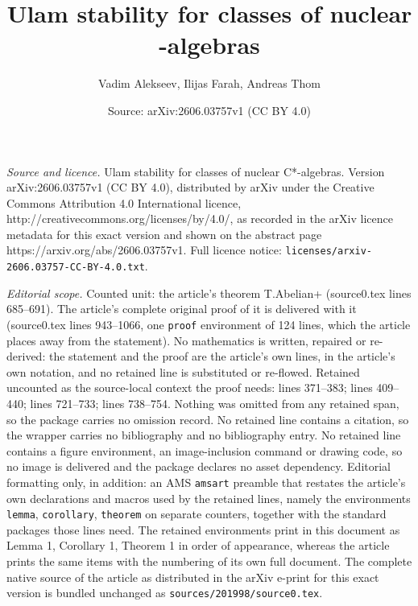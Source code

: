 \documentclass[10pt,a4paper]{amsart}
\title{Ulam stability for classes of nuclear \cstar-algebras}
\author{Vadim Alekseev, Ilijas Farah, Andreas Thom}
\date{Source: arXiv:2606.03757v1 (CC BY 4.0)}
\newcommand{\cstar}{C*}
\begin{document}
\maketitle

\noindent\emph{Source and licence.} Ulam stability for classes of nuclear \cstar-algebras. Version arXiv:2606.03757v1 (CC BY 4.0), distributed by arXiv under the Creative Commons Attribution 4.0 International licence, http://creativecommons.org/licenses/by/4.0/, as recorded in the arXiv licence metadata for this exact version and shown on the abstract page https://arxiv.org/abs/2606.03757v1. Full licence notice: \texttt{licenses/arxiv-2606.03757-CC-BY-4.0.txt}.\par\smallskip

\noindent\textit{Editorial scope.} Counted unit: the article's theorem T.Abelian+ (source0.tex lines 685--691). The article's complete original proof of it is delivered with it (source0.tex lines 943--1066, one \texttt{proof} environment of 124 lines, which the article places away from the statement). No mathematics is written, repaired or re-derived: the statement and the proof are the article's own lines, in the article's own notation, and no retained line is substituted or re-flowed.  Retained uncounted as the source-local context the proof needs: lines 371--383; lines 409--440; lines 721--733; lines 738--754.  Nothing was omitted from any retained span, so the package carries no omission record.  No retained line contains a citation, so the wrapper carries no bibliography and no bibliography entry.  No retained line contains a figure environment, an image-inclusion command or drawing code, so no image is delivered and the package declares no asset dependency.  Editorial formatting only, in addition: an AMS \texttt{amsart} preamble that restates the article's own declarations and macros used by the retained lines, namely the environments \texttt{lemma}, \texttt{corollary}, \texttt{theorem} on separate counters, together with the standard packages those lines need.  The retained environments print in this document as Lemma 1, Corollary 1, Theorem 1 in order of appearance, whereas the article prints the same items with the numbering of its own full document.  The complete native source of the article as distributed in the arXiv e-print for this exact version is bundled unchanged as \texttt{sources/201998/source0.tex}.
\end{document}
